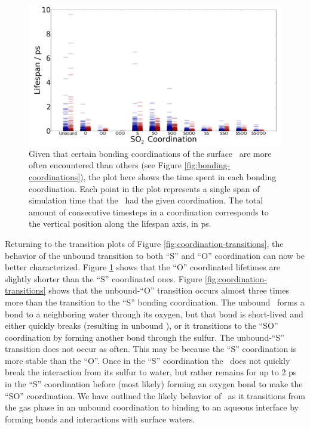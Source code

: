 \documentclass{article}
\begin{document}
\begin{figure}[h!]
	\begin{center}
		\includegraphics[scale=1.0]{coordination-lifespans.png}
		\caption{Given that certain bonding coordinations of the surface \suldiox~are more often encountered than others (see Figure \ref{fig:bonding-coordinations}), the plot here shows the time spent in each bonding coordination. Each point in the plot represents a single span of simulation time that the \suldiox~had the given coordination. The total amount of consecutive timesteps in a coordination corresponds to the vertical position along the lifespan axis, in ps.}
		\label{fig:coordination-lifespans}
	\end{center}
\end{figure}

Returning to the transition plots of Figure \ref{fig:coordination-transitions}, the behavior of the unbound transition to both ``S'' and ``O'' coordination can now be better characterized. Figure \ref{fig:coordination-lifespans} shows that the ``O'' coordinated lifetimes are slightly shorter than the ``S'' coordinated ones. Figure \ref{fig:coordination-transitions} shows that the unbound-``O'' transition occurs almost three times more than the transition to the ``S'' bonding coordination. The unbound \suldiox~forms a bond to a neighboring water through its oxygen, but that bond is short-lived and either quickly breaks (resulting in unbound \suldiox), or it transitions to the ``SO'' coordination by forming another bond through the sulfur. The unbound-``S'' transition does not occur as often. This may be because the ``S'' coordination is more stable than the ``O''. Once in the ``S'' coordination the \suldiox~does not quickly break the interaction from its sulfur to water, but rather remains for up to 2 ps in the ``S'' coordination before (most likely) forming an oxygen bond to make the ``SO'' coordination. We have outlined the likely behavior of \suldiox~as it transitions from the gas phase in an unbound coordination to binding to an aqueous interface by forming bonds and interactions with surface waters.
\end{document}
